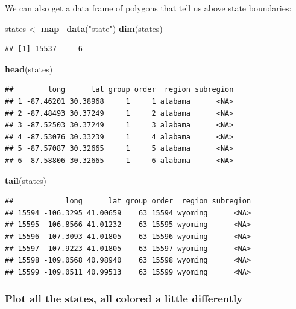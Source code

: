 \documentclass[]{book}
\newenvironment{Shaded}{\begin{snugshade}}{\end{snugshade}}
\newcommand{\KeywordTok}[1]{\textcolor[rgb]{0.13,0.29,0.53}{\textbf{{#1}}}}
\newcommand{\StringTok}[1]{\textcolor[rgb]{0.31,0.60,0.02}{{#1}}}
\newcommand{\NormalTok}[1]{{#1}}
\theoremstyle{definition}
\theoremstyle{definition}
\theoremstyle{remark}
\begin{document}
We can also get a data frame of polygons that tell us above state
boundaries:

\begin{Shaded}
\begin{Highlighting}[]
\NormalTok{states <-}\StringTok{ }\KeywordTok{map_data}\NormalTok{(}\StringTok{"state"}\NormalTok{)}
\KeywordTok{dim}\NormalTok{(states)}
\end{Highlighting}
\end{Shaded}

\begin{verbatim}
## [1] 15537     6
\end{verbatim}

\begin{Shaded}
\begin{Highlighting}[]
\KeywordTok{head}\NormalTok{(states)}
\end{Highlighting}
\end{Shaded}

\begin{verbatim}
##        long      lat group order  region subregion
## 1 -87.46201 30.38968     1     1 alabama      <NA>
## 2 -87.48493 30.37249     1     2 alabama      <NA>
## 3 -87.52503 30.37249     1     3 alabama      <NA>
## 4 -87.53076 30.33239     1     4 alabama      <NA>
## 5 -87.57087 30.32665     1     5 alabama      <NA>
## 6 -87.58806 30.32665     1     6 alabama      <NA>
\end{verbatim}

\begin{Shaded}
\begin{Highlighting}[]
\KeywordTok{tail}\NormalTok{(states)}
\end{Highlighting}
\end{Shaded}

\begin{verbatim}
##            long      lat group order  region subregion
## 15594 -106.3295 41.00659    63 15594 wyoming      <NA>
## 15595 -106.8566 41.01232    63 15595 wyoming      <NA>
## 15596 -107.3093 41.01805    63 15596 wyoming      <NA>
## 15597 -107.9223 41.01805    63 15597 wyoming      <NA>
## 15598 -109.0568 40.98940    63 15598 wyoming      <NA>
## 15599 -109.0511 40.99513    63 15599 wyoming      <NA>
\end{verbatim}

\subsubsection{Plot all the states, all colored a little
differently}\label{plot-all-the-states-all-colored-a-little-differently}
\end{document}
